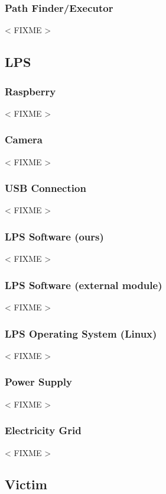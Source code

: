 \documentclass[a4paper,parskip,headheight=38pt]{scrartcl} %
\newcommand{\incomplete}[1]{\textless{} #1 \textgreater{}}
\begin{document}
\subsubsection{Path Finder/Executor} %
\incomplete{FIXME}

\subsection{LPS} %

\subsubsection{Raspberry}
\incomplete{FIXME}

\subsubsection{Camera}
\incomplete{FIXME}

\subsubsection{USB Connection}
\incomplete{FIXME}

\subsubsection{LPS Software (ours)}
\incomplete{FIXME}

\subsubsection{LPS Software (external module)}
\incomplete{FIXME}

\subsubsection{LPS Operating System (Linux)}
\incomplete{FIXME}

\subsubsection{Power Supply}
\incomplete{FIXME}

\subsubsection{Electricity Grid}
\incomplete{FIXME}

\subsection{Victim} %
\end{document}
